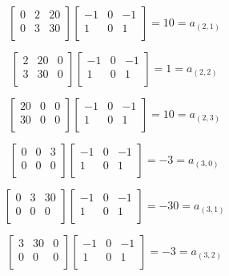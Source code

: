\documentclass[11pt]{article}
\theoremstyle{plain}
\begin{document}
\[
	\begin{bmatrix}
		0 & 2 & 20 \\
		0 & 3 & 30 \\
	\end{bmatrix}
	\begin{bmatrix}
		-1 & 0 & -1 \\
		1  & 0 & 1  \\
	\end{bmatrix}
	= 10 = a_{(2,1)}
\]

\[
	\begin{bmatrix}
		2 & 20 & 0 \\
		3 & 30 & 0 \\
	\end{bmatrix}
	\begin{bmatrix}
		-1 & 0 & -1 \\
		1  & 0 & 1  \\
	\end{bmatrix}
	= 1 = a_{(2,2)}
\]

\[
	\begin{bmatrix}
		20 & 0 & 0 \\
		30 & 0 & 0 \\
	\end{bmatrix}
	\begin{bmatrix}
		-1 & 0 & -1 \\
		1  & 0 & 1  \\
	\end{bmatrix}
	= 10 = a_{(2,3)}
\]

\[
	\begin{bmatrix}
		0 & 0 & 3 \\
		0 & 0 & 0 \\
	\end{bmatrix}
	\begin{bmatrix}
		-1 & 0 & -1 \\
		1  & 0 & 1  \\
	\end{bmatrix}
	= -3 = a_{(3,0)}
\]

\[
	\begin{bmatrix}
		0 & 3 & 30 \\
		0 & 0 & 0  \\
	\end{bmatrix}
	\begin{bmatrix}
		-1 & 0 & -1 \\
		1  & 0 & 1  \\
	\end{bmatrix}
	= -30 = a_{(3,1)}
\]

\[
	\begin{bmatrix}
		3 & 30 & 0 \\
		0 & 0  & 0 \\
	\end{bmatrix}
	\begin{bmatrix}
		-1 & 0 & -1 \\
		1  & 0 & 1  \\
	\end{bmatrix}
	= -3 = a_{(3,2)}
\]
\end{document}
